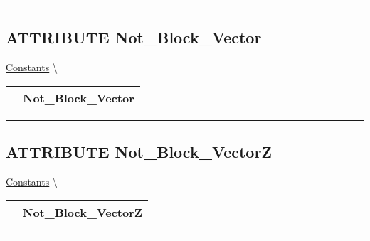 \par


\rule{\linewidth}{0.5pt}
\subsection*{\textsf{\colorbox{headtoc}{\color{white} ATTRIBUTE}
Not\_Block\_Vector}}

\hypertarget{ecldoc:pbblas.constants.not_block_vector}{}
\hspace{0pt} \hyperlink{ecldoc:PBblas.Constants}{Constants} \textbackslash 

{\renewcommand{\arraystretch}{1.5}
\begin{tabularx}{\textwidth}{|>{\raggedright\arraybackslash}l|X|}
\hline
\hspace{0pt}\mytexttt{\color{red} } & \textbf{Not\_Block\_Vector} \\
\hline
\end{tabularx}
}

\par


\rule{\linewidth}{0.5pt}
\subsection*{\textsf{\colorbox{headtoc}{\color{white} ATTRIBUTE}
Not\_Block\_VectorZ}}

\hypertarget{ecldoc:pbblas.constants.not_block_vectorz}{}
\hspace{0pt} \hyperlink{ecldoc:PBblas.Constants}{Constants} \textbackslash 

{\renewcommand{\arraystretch}{1.5}
\begin{tabularx}{\textwidth}{|>{\raggedright\arraybackslash}l|X|}
\hline
\hspace{0pt}\mytexttt{\color{red} } & \textbf{Not\_Block\_VectorZ} \\
\hline
\end{tabularx}
}

\par


\rule{\linewidth}{0.5pt}


